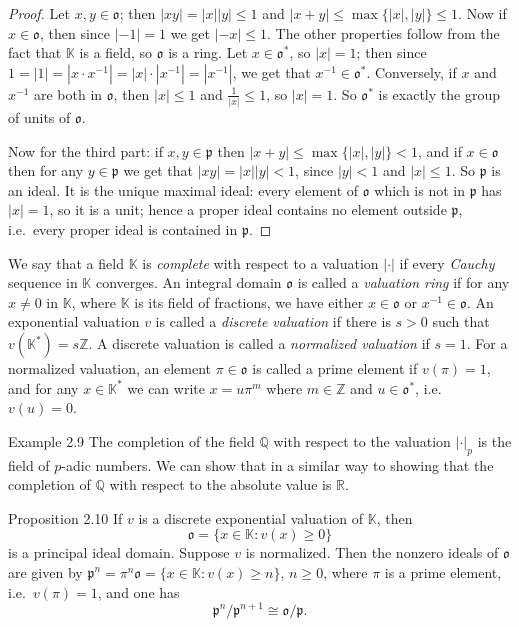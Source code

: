 \documentclass[11pt]{article}
\begin{document}
\begin{proof}
Let $x, y \in \mathfrak{o}$; then $|xy| = |x||y| \leq 1$ and $|x + y| \leq \max\{|x|, |y|\} \leq 1$. Now if $x \in \mathfrak{o}$, then since $|-1| = 1$ we get $|-x| \leq 1$. The other properties follow from the fact that $\mathbb{K}$ is a field, so $\mathfrak{o}$ is a ring. Let $x \in \mathfrak{o}^*$, so $|x| = 1$; then since $1 = |1| = |x\cdot x^{-1}| = |x|\cdot|x^{-1}| = |x^{-1}|$, we get that $x^{-1} \in \mathfrak{o}^*$. Conversely, if $x$ and $x^{-1}$ are both in $\mathfrak{o}$, then $|x| \leq 1$ and $\frac{1}{|x|} \leq 1$, so $|x| = 1$. So $\mathfrak{o}^*$ is exactly the group of units of $\mathfrak{o}$.

Now for the third part: if $x, y \in \mathfrak{p}$ then $|x + y| \leq \max\{|x|, |y|\} < 1$, and if $x \in \mathfrak{o}$ then for any $y \in \mathfrak{p}$ we get that $|xy| = |x||y| < 1$, since $|y| < 1$ and $|x| \leq 1$. So $\mathfrak{p}$ is an ideal. It is the unique maximal ideal: every element of $\mathfrak{o}$ which is not in $\mathfrak{p}$ has $|x| = 1$, so it is a unit; hence a proper ideal contains no element outside $\mathfrak{p}$, i.e.\ every proper ideal is contained in $\mathfrak{p}$.
\end{proof}

We say that a field $\mathbb{K}$ is \textit{complete} with respect to a valuation $|\cdot|$ if every \textit{Cauchy} sequence in $\mathbb{K}$ converges. An integral domain $\mathfrak{o}$ is called a \textit{valuation ring} if for any $x \neq 0$ in $\mathbb{K}$, where $\mathbb{K}$ is its field of fractions, we have either $x \in \mathfrak{o}$ or $x^{-1} \in \mathfrak{o}$. An exponential valuation $v$ is called a \textit{discrete valuation} if there is $s > 0$ such that $v(\mathbb{K}^*) = s\mathbb{Z}$. A discrete valuation is called a \textit{normalized valuation} if $s = 1$. For a normalized valuation, an element $\pi \in \mathfrak{o}$ is called a prime element if $v(\pi) = 1$, and for any $x \in \mathbb{K}^*$ we can write $x = u\pi^m$ where $m \in \mathbb{Z}$ and $u \in \mathfrak{o}^*$, i.e.\ $v(u) = 0$.

\begin{exbox}{Example 2.9}
The completion of the field $\mathbb{Q}$ with respect to the valuation $|\cdot|_p$ is the field of $p$-adic numbers. We can show that in a similar way to showing that the completion of $\mathbb{Q}$ with respect to the absolute value is $\mathbb{R}$.
\end{exbox}

\begin{thmbox}{Proposition 2.10}
If $v$ is a discrete exponential valuation of $\mathbb{K}$, then
\[
\mathfrak{o} = \{ x \in \mathbb{K} : v(x) \geq 0 \}
\]
is a principal ideal domain. Suppose $v$ is normalized. Then the nonzero ideals of $\mathfrak{o}$ are given by $\mathfrak{p}^n = \pi^n \mathfrak{o} = \{ x \in \mathbb{K} : v(x) \geq n \}$, $n \geq 0$, where $\pi$ is a prime element, i.e.\ $v(\pi) = 1$, and one has
\[
\mathfrak{p}^n / \mathfrak{p}^{n+1} \cong \mathfrak{o}/\mathfrak{p} .
\]
\end{thmbox}
\end{document}
